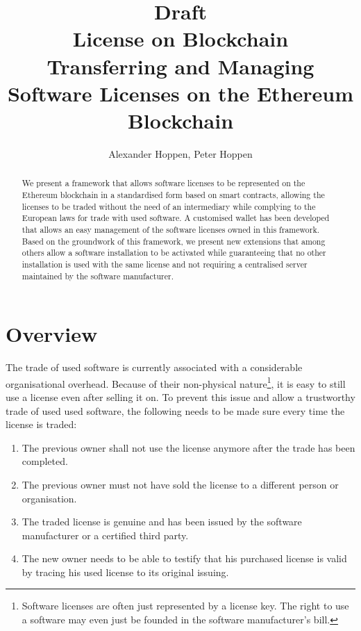 \documentclass[a4paper]{article}
\title{\textsf{\Huge Draft} \\[3mm] License on Blockchain \\[2mm] \large Transferring and Managing Software Licenses on the Ethereum Blockchain}
\author{Alexander Hoppen, Peter Hoppen}
\begin{document}
\maketitle



\begin{abstract}
  We present a framework that allows software licenses to be represented on the Ethereum blockchain in a standardised form based on smart contracts, allowing the licenses to be traded without the need of an intermediary while complying to the European laws for trade with used software. A customised wallet has been developed that allows an easy management of the software licenses owned in this framework. Based on the groundwork of this framework, we present new extensions that among others allow a software installation to be activated while guaranteeing that no other installation is used with the same license and not requiring a centralised server maintained by the software manufacturer.
\end{abstract}

\section{Overview}

The trade of used software is currently associated with a considerable organisational overhead. Because of their non-physical nature\footnote{Software licenses are often just represented by a license key. The right to use a software may even just be founded in the software manufacturer's bill.}, it is easy to still use a license even after selling it on. To prevent this issue and allow a trustworthy trade of used used software, the following needs to be made sure every time the license is traded:
\begin{enumerate}
  \item The previous owner shall not use the license anymore after the trade has been completed.
  \item The previous owner must not have sold the license to a different person or organisation.
  \item The traded license is genuine and has been issued by the software manufacturer or a certified third party.
  \item The new owner needs to be able to testify that his purchased license is valid by tracing his used license to its original issuing.
\end{enumerate}
\end{document}

